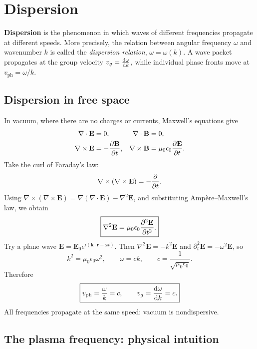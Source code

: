 \documentclass[11pt]{article}
\newcommand{\epsz}{\epsilon_0}
\newcommand{\muz}{\mu_0}
\begin{document}
\section{Dispersion}\label{sec:em_fundementals_dispersion}
\textbf{Dispersion} is the phenomenon in which waves of different frequencies propagate at different speeds. More precisely, the relation between angular frequency $\omega$ and wavenumber $k$ is called the \emph{dispersion relation}, $\omega=\omega(k)$. A wave packet propagates at the group velocity $v_g=\dv{\omega}{k}$, while individual phase fronts move at $v_\mathrm{ph}=\omega/k$.

\subsection{Dispersion in free space}
In vacuum, where there are no charges or currents, Maxwell's equations give
\begin{align}
\nabla\cdot\mathbf E&=0,&\nabla\cdot\mathbf B&=0,\\
\nabla\times\mathbf E&=-\pdv{\mathbf B}{t},&
\nabla\times\mathbf B&=\muz\epsz\pdv{\mathbf E}{t}.
\end{align}
Take the curl of Faraday's law:
\begin{equation}
\nabla\times(\nabla\times\mathbf E)=-\pdv{}{t}(\nabla\times\mathbf B).
\end{equation}
Using $\nabla\times(\nabla\times\mathbf E)=\nabla(\nabla\cdot\mathbf E)-\nabla^2\mathbf E$, and substituting Amp\`ere--Maxwell's law, we obtain
\begin{equation}
\boxed{\nabla^2\mathbf E=\muz\epsz\pdv[2]{\mathbf E}{t}.}
\end{equation}
Try a plane wave $\mathbf E=\mathbf E_0 e^{i(\mathbf k\cdot\mathbf r-\omega t)}$. Then $\nabla^2\mathbf E=-k^2\mathbf E$ and $\partial_t^2\mathbf E=-\omega^2\mathbf E$, so
\begin{equation}
k^2=\muz\epsz\omega^2,\qquad
\boxed{\omega=ck},\qquad c=\frac{1}{\sqrt{\muz\epsz}}.
\end{equation}
Therefore
\begin{equation}
\boxed{v_\mathrm{ph}=\frac{\omega}{k}=c,\qquad v_g=\dv{\omega}{k}=c.}
\end{equation}
All frequencies propagate at the same speed: vacuum is nondispersive.


\subsection{The plasma frequency: physical intuition}
\end{document}

